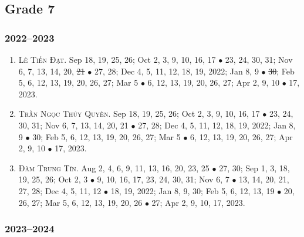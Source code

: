 \documentclass{article}
\begin{document}
\subsection{Grade 7}

\subsubsection{2022--2023}

\begin{enumerate}
	\item \textsc{Lê Tiến Đạt.} {\sf[In]} Sep 18, 19, 25, 26; Oct 2, 3, 9, 10, 16, 17 $\bullet$ 23, 24, 30, 31; Nov 6, 7, 13, 14, 20, \st{21} $\bullet$ 27, 28; Dec 4, 5, 11, 12, 18, 19, 2022; Jan 8, 9 $\bullet$ \st{30}; Feb 5, 6, 12, 13, 19, 20, 26, 27; Mar 5 $\bullet$ 6, 12, 13, 19, 20, 26, 27; Apr 2, 9, 10 $\bullet$ 17, 2023.
	\item \textsc{Trần Ngọc Thúy Quyên.} {\sf[In]} Sep 18, 19, 25, 26; Oct 2, 3, 9, 10, 16, 17 $\bullet$ 23, 24, 30, 31; Nov 6, 7, 13, 14, 20, 21 $\bullet$ 27, 28; Dec 4, 5, 11, 12, 18, 19, 2022; Jan 8, 9 $\bullet$ 30; Feb 5, 6, 12, 13, 19, 20, 26, 27; Mar 5 $\bullet$ 6, 12, 13, 19, 20, 26, 27; Apr 2, 9, 10 $\bullet$ 17, 2023.
	\item \textsc{Đàm Trung Tín.} {\sf[In]} Aug 2, 4, 6, 9, 11, 13, 16, 20, 23, 25 $\bullet$ 27, 30; Sep 1, 3, 18, 19, 25, 26; Oct 2, 3 $\bullet$ 9, 10, 16, 17, 23, 24, 30, 31; Nov 6, 7 $\bullet$ 13, 14, 20, 21, 27, 28; Dec 4, 5, 11, 12 $\bullet$ 18, 19, 2022; Jan 8, 9, 30; Feb 5, 6, 12, 13, 19 $\bullet$ 20, 26, 27; Mar 5, 6, 12, 13, 19, 20, 26 $\bullet$ 27; Apr 2, 9, 10, 17, 2023. {\sf[Out]}
\end{enumerate}

\subsubsection{2023--2024}
\end{document}
